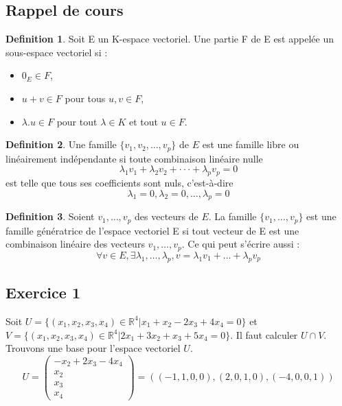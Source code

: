 \documentclass[]{book}
\theoremstyle{definition}
\newtheorem{defn}{Definition}
\newcommand{\bb}[1]{\mathbb{#1}}
\newcommand{\R}{\bb{R}}
\begin{document}
\subsection*{Rappel de cours}

\begin{defn}
Soit E un K-espace vectoriel. Une partie F de E est appelée un sous-espace vectoriel si :
\begin{itemize}
\item $0_E \in F$,
\item $u + v \in F$ pour tous $u, v \in F$,
\item $\lambda.u \in F$ pour tout $\lambda \in K$ et tout $u \in F$.
\end{itemize}
\end{defn}


\begin{defn}
Une famille $\{v_1, v_2, \ldots , v_p\}$ de $E$ est une famille libre ou lin\'eairement ind\'ependante si toute combinaison lin\'eaire nulle
$$\lambda_1v_1 + \lambda_2v_2 + ··· + \lambda_p v_p = 0$$
est telle que tous ses coefficients sont nuls, c’est-\`a-dire
$$\lambda_1 = 0, \lambda_2 = 0, \ldots, \lambda_p = 0$$
\end{defn}



\begin{defn}
Soient $v_1, \ldots, v_p$ des vecteurs de $E$. La famille $\{v_1, \ldots, v_p\}$ est une famille g\'en\'eratrice de l'espace vectoriel E si tout vecteur de E est une combinaison lin\'eaire des vecteurs $v_1, \ldots, v_p$. Ce qui peut s'\'ecrire aussi :
$$\forall v \in E, \exists \lambda_1, \ldots, \lambda_p, v = \lambda_1 v_1 + \ldots + \lambda_p v_p$$
\end{defn}


\newpage
\subsection*{Exercice 1}

Soit $U=\{(x_1,x_2,x_3,x_4) \in \R^4 | x_1+x_2-2x_3+4x_4 = 0\}$ et $V=\{(x_1,x_2,x_3,x_4) \in \R^4 | 2x_1+3x_2+x_3+5x_4 = 0\}$. Il faut calculer $U \cap V$.\\
Trouvons une base pour l'espace vectoriel $U$. 
$$U=\begin{pmatrix} -x_2+2x_3-4x_4 \\ x_2 \\ x_3 \\ x_4 \end{pmatrix} = ((-1,1,0,0),(2,0,1,0),(-4,0,0,1))$$ 
\end{document}
